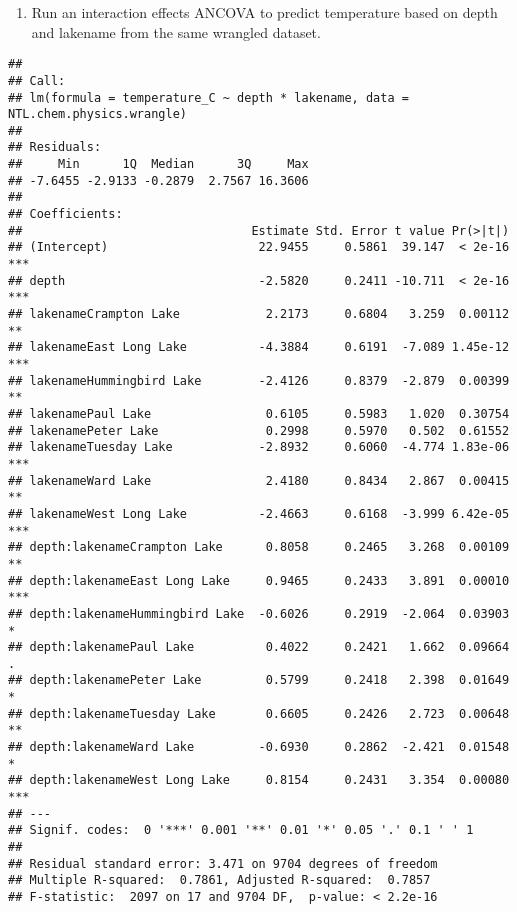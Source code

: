 \documentclass[]{article}
\newenvironment{Shaded}{\begin{snugshade}}{\end{snugshade}}
\newcommand{\KeywordTok}[1]{\textcolor[rgb]{0.13,0.29,0.53}{\textbf{#1}}}
\newcommand{\DataTypeTok}[1]{\textcolor[rgb]{0.13,0.29,0.53}{#1}}
\newcommand{\StringTok}[1]{\textcolor[rgb]{0.31,0.60,0.02}{#1}}
\newcommand{\CommentTok}[1]{\textcolor[rgb]{0.56,0.35,0.01}{\textit{#1}}}
\newcommand{\OperatorTok}[1]{\textcolor[rgb]{0.81,0.36,0.00}{\textbf{#1}}}
\newcommand{\NormalTok}[1]{#1}
\providecommand{\tightlist}{%
  \setlength{\itemsep}{0pt}\setlength{\parskip}{0pt}}
\begin{document}
\begin{enumerate}
\def\labelenumi{\arabic{enumi}.}
\setcounter{enumi}{5}
\tightlist
\item
  Run an interaction effects ANCOVA to predict temperature based on
  depth and lakename from the same wrangled dataset.
\end{enumerate}

\begin{Shaded}
\end{Shaded}

\begin{verbatim}
## 
## Call:
## lm(formula = temperature_C ~ depth * lakename, data = NTL.chem.physics.wrangle)
## 
## Residuals:
##     Min      1Q  Median      3Q     Max 
## -7.6455 -2.9133 -0.2879  2.7567 16.3606 
## 
## Coefficients:
##                                Estimate Std. Error t value Pr(>|t|)    
## (Intercept)                     22.9455     0.5861  39.147  < 2e-16 ***
## depth                           -2.5820     0.2411 -10.711  < 2e-16 ***
## lakenameCrampton Lake            2.2173     0.6804   3.259  0.00112 ** 
## lakenameEast Long Lake          -4.3884     0.6191  -7.089 1.45e-12 ***
## lakenameHummingbird Lake        -2.4126     0.8379  -2.879  0.00399 ** 
## lakenamePaul Lake                0.6105     0.5983   1.020  0.30754    
## lakenamePeter Lake               0.2998     0.5970   0.502  0.61552    
## lakenameTuesday Lake            -2.8932     0.6060  -4.774 1.83e-06 ***
## lakenameWard Lake                2.4180     0.8434   2.867  0.00415 ** 
## lakenameWest Long Lake          -2.4663     0.6168  -3.999 6.42e-05 ***
## depth:lakenameCrampton Lake      0.8058     0.2465   3.268  0.00109 ** 
## depth:lakenameEast Long Lake     0.9465     0.2433   3.891  0.00010 ***
## depth:lakenameHummingbird Lake  -0.6026     0.2919  -2.064  0.03903 *  
## depth:lakenamePaul Lake          0.4022     0.2421   1.662  0.09664 .  
## depth:lakenamePeter Lake         0.5799     0.2418   2.398  0.01649 *  
## depth:lakenameTuesday Lake       0.6605     0.2426   2.723  0.00648 ** 
## depth:lakenameWard Lake         -0.6930     0.2862  -2.421  0.01548 *  
## depth:lakenameWest Long Lake     0.8154     0.2431   3.354  0.00080 ***
## ---
## Signif. codes:  0 '***' 0.001 '**' 0.01 '*' 0.05 '.' 0.1 ' ' 1
## 
## Residual standard error: 3.471 on 9704 degrees of freedom
## Multiple R-squared:  0.7861, Adjusted R-squared:  0.7857 
## F-statistic:  2097 on 17 and 9704 DF,  p-value: < 2.2e-16
\end{verbatim}
\end{document}
